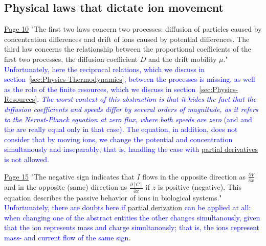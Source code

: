 \subsection{Physical laws that dictate ion movement\label{sec:Physics-PhysicalLaws}}
\href{https://rcweb.dartmouth.edu/~mvdm/wiki/lib/exe/fetch.php?media=analysis:johnstonwu.pdf}{Page 10} "The first two laws concern two processes: diffusion of particles caused
by concentration differences and drift of ions caused by potential differences. The third law concerns the relationship between the proportional
coefficients of the first two processes, the diffusion coefficient $D$ and the
drift mobility $\mu$." \textcolor{blue}{Unfortunately, here the reciprocal relations, which we discuss in section~\ref{sec:Physics-Thermodynamics}, between the processes is missing, as well as the role of the finite resources, which we
discuss in section~\ref{sec:Physics-Resources}. %
\textit{The worst context of this abstraction is that it hides the fact that the diffusion coefficients and speeds differ by several orders of magnitude, as it refers to the Nernst-Planck equation at zero flux, where both speeds are zero} (and and the are really equal only in that case). The equation, in addition, does not consider that by moving ions, we change the potential and concentration simultanously and
inseparably; that is, handling the case with \hyperlink{PartialDerivative}{partial derivatives} is not allowed.
}

\href{https://rcweb.dartmouth.edu/~mvdm/wiki/lib/exe/fetch.php?media=analysis:johnstonwu.pdf}{Page 15} "The
negative sign indicates that $I$ flows in the opposite direction as $\frac{\partial V}{\partial x}$ and in
the opposite (same) direction as $\frac{\partial [C]}{\partial x}$
if $z$ is positive (negative).
This equation describes the passive behavior of ions in biological systems."
\textcolor{blue}{Unfortunately, there are doubts here if \hyperlink{PartialDerivative}{partial derivation} can be applied at all: when changing one of the abstract entities the other changes simultanously, given that the ion represents mass and charge simultanously; that is, the ions represent mass- and current flow of the same sign.}

